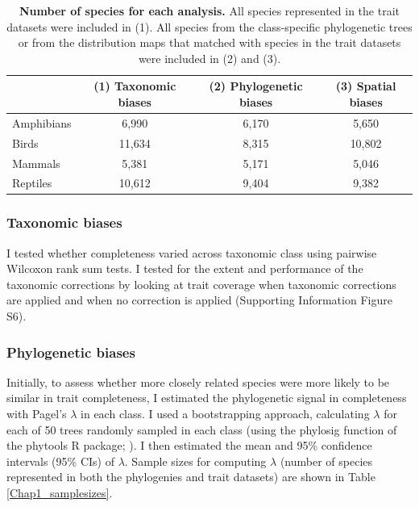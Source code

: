 \begin{table}[h!]
\renewcommand{\baselinestretch}{1}
\renewcommand{\arraystretch}{1.5}
\caption[Number of species for each analysis.]{\textbf{Number of species for each analysis.} All species represented in the trait datasets were included in (1). All species from the class-specific phylogenetic trees or from the distribution maps that matched with species in the trait datasets were included in (2) and (3).}
\label{Chap1_samplesizes}
\label{samplesizes}
\begin{center}\fontsize{9}{11}\selectfont
\begin{tabular}{l|c|c|c|}
\cline{2-4}
                                 & \textbf{(1) Taxonomic biases} & \textbf{(2) Phylogenetic biases} & \textbf{(3) Spatial biases} \\ \hline
\multicolumn{1}{|l|}{Amphibians} & 6,990             & 6,170               & 5,650          \\ \hline
\multicolumn{1}{|l|}{Birds}      & 11,634            & 8,315               & 10,802          \\ \hline
\multicolumn{1}{|l|}{Mammals}    & 5,381             & 5,171               & 5,046          \\ \hline
\multicolumn{1}{|l|}{Reptiles}   & 10,612            & 9,404               & 9,382          \\ \hline
\end{tabular}
\end{center}
\end{table}

\subsubsection{Taxonomic biases}
I tested whether completeness varied across taxonomic class using pairwise Wilcoxon rank sum tests. I tested for the extent and performance of the taxonomic corrections by looking at trait coverage when taxonomic corrections are applied and when no correction is applied (Supporting Information Figure S6).

\subsubsection{Phylogenetic biases}
Initially, to assess whether more closely related species were more likely to be similar in trait completeness, I estimated the phylogenetic signal in completeness with Pagel’s $\lambda$ \citep{Pagel1999} in each class. I used a bootstrapping approach, calculating $\lambda$ for each of 50 trees randomly sampled in each class (using the phylosig function of the phytools R package; \cite{Revell2012}). I then estimated the mean and 95\% confidence intervals (95\% CIs) of $\lambda$. Sample sizes for computing $\lambda$ (number of species represented in both the phylogenies and trait datasets) are shown in Table \ref{Chap1_samplesizes}.

